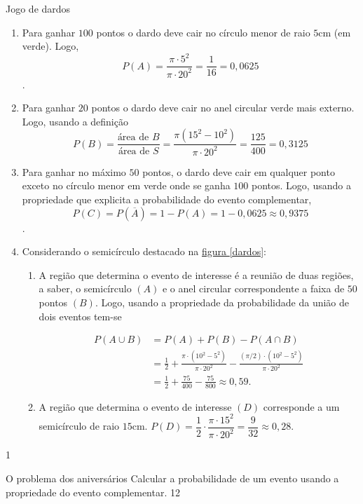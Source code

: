 \begin{answer}{Jogo de dardos}
{
\begin{enumerate}
\item Para ganhar $100$ pontos o dardo deve cair no círculo menor de raio $5$cm (em verde). Logo, 
$$P(A)=\dfrac{\pi\cdot5^2}{\pi\cdot20^2}=\dfrac{1}{16}=0{,}0625$$.
\item Para ganhar $20$ pontos o dardo deve cair no anel circular verde mais externo. Logo, usando a definição 
\begin{equation*}
P(B)=\frac{\text{área de $B$}}{\text{área de $S$}}=\frac{\pi(15^2-10^2)}{\pi\cdot20^2}=\frac{125}{400}=0{,}3125
\end{equation*}
\item Para ganhar no máximo $50$ pontos, o dardo deve cair em qualquer ponto exceto no círculo menor em verde onde se ganha $100$ pontos. Logo, usando a propriedade que explicita a probabilidade do evento complementar, \begin{equation*}
P(C)=P(\overline{A})=1-P(A)=1-0{,}0625\approx0{,}9375
\end{equation*}.
\item Considerando o semicírculo destacado na \hyperref[dardos]{figura \ref{dardos}}:\begin{enumerate}
\item A região que determina o evento de interesse é a reunião de duas regiões, a saber, o semicírculo $(A)$ e o anel circular correspondente a faixa de $50$ pontos $(B)$. Logo, usando a propriedade da probabilidade da união de dois eventos tem-se 

\begin{align*}
P(A\cup B)&=P(A)+P(B)-P(A\cap B)\\
&=\frac{1}{2}+\frac{\pi\cdot(10^2-5^2)}{\pi\cdot20^2}-\frac{(\pi/2)\cdot(10^2-5^2)}{\pi\cdot20^2}\\
&=\frac{1}{2}+\frac{75}{400}-\frac{75}{800}\approx0{,}59.
\end{align*}

\item A região que determina o evento de interesse $(D)$ corresponde a um semicírculo de raio $15$cm. $P(D)=\dfrac{1}{2}\cdot\dfrac{\pi\cdot15^2}{\pi\cdot20^2}=\dfrac{9}{32}\approx0{,}28$.
\end{enumerate}
\end{enumerate}
}{1}
\end{answer}
\clearmargin
\begin{objectives}{O problema dos aniversários}
{
Calcular a probabilidade de um evento usando a propriedade do evento complementar.
}{1}{2}
\end{objectives}

